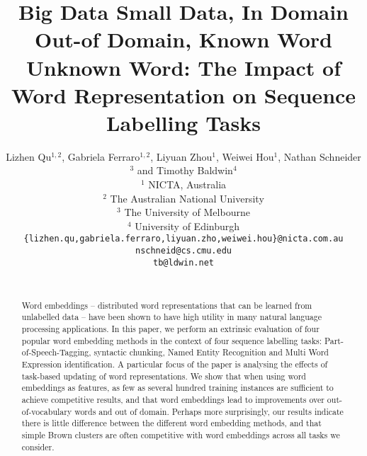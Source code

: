\documentclass[11pt]{article}
\title{Big Data Small Data, In Domain Out-of Domain, Known Word Unknown
  Word: The Impact of Word Representation on Sequence Labelling Tasks}
\author{
Lizhen Qu$^{1,2}$, Gabriela Ferraro$^{1,2}$, Liyuan Zhou$^1$, Weiwei Hou$^1$, Nathan Schneider$^3$ and Timothy Baldwin$^4$ \\
$^1$ NICTA, Australia \\
$^2$ The Australian National University\\
$^3$ The University of Melbourne \\
$^4$ University of Edinburgh\\
{\tt \{lizhen.qu,gabriela.ferraro,liyuan.zho,weiwei.hou\}@nicta.com.au}\\
{\tt nschneid@cs.cmu.edu}\\
{\tt tb@ldwin.net}\\ 
~~\\
}
\begin{document}
\maketitle


\begin{abstract} 
  Word embeddings -- distributed word representations that can be
  learned from unlabelled data -- have been shown to have high utility
  in many natural language processing applications. 
  In this paper, we perform an extrinsic evaluation of four popular word
  embedding methods in the context of four sequence labelling tasks:
  Part-of-Speech-Tagging, syntactic chunking, Named Entity Recognition and    Multi Word Expression identification.
  A particular focus of the paper is analysing the effects of task-based
  updating of word representations.
  We show that when using word embeddings as features, as few as
  several hundred training instances are sufficient to achieve competitive
  results, and that word embeddings lead to improvements over out-of-vocabulary words
  and out of domain.
  Perhaps more surprisingly, our results indicate there is little
  difference between the different word embedding methods, and that simple
  Brown clusters are often competitive with word embeddings across all
  tasks we consider. 
\end{abstract}

\newcommand{\gabi}[1]{\textcolor{blue}{#1}}
\newcommand{\tim}[1]{\textcolor{red}{#1}}
\newcommand{\lizhen}[1]{\textcolor{green}{#1}}
\newcommand{\nss}[1]{\textcolor{magenta}{#1}}













\end{document}

